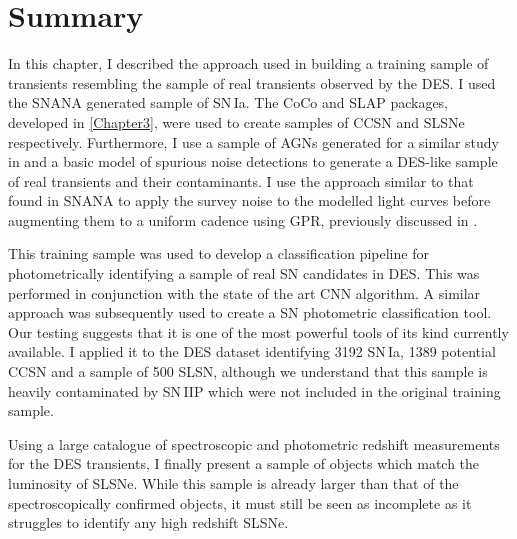 \section{Summary}
In this chapter, I described the approach used in building a training sample of transients resembling the sample of real transients observed by the DES. I used the SNANA generated sample of SN\,Ia. The CoCo and SLAP packages, developed in \cref{Chapter3}, were used to create samples of CCSN and SLSNe respectively. Furthermore, I use a sample of AGNs generated for a similar study in \citet{Honig2016} and a basic model of spurious noise detections to generate a DES-like sample of real transients and their contaminants. I use the approach similar to that found in SNANA to apply the survey noise to the modelled light curves before augmenting them to a uniform cadence using GPR, previously discussed in .

This training sample was used to develop a classification pipeline for photometrically identifying a sample of real SN candidates in DES. This was performed in conjunction with the state of the art CNN algorithm. A similar approach was subsequently used to create a SN photometric classification tool. Our testing suggests that it is one of the most powerful tools of its kind currently available. I applied it to the DES dataset identifying 3192 SN\,Ia, 1389 potential CCSN and a sample of 500 SLSN, although we understand that this sample is heavily contaminated by SN\,IIP which were not included in the original training sample.

Using a large catalogue of spectroscopic and photometric redshift measurements for the DES transients, I finally present a sample of objects which match the luminosity of SLSNe. While this sample is already larger than that of the spectroscopically confirmed objects, it must still be seen as incomplete as it struggles to identify any high redshift SLSNe.
